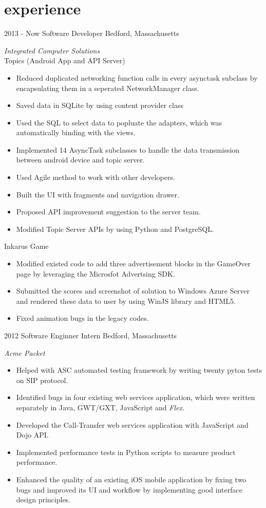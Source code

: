 \documentclass[]{ly-cv} %
\begin{document}
\section{experience}
\begin{entrylist}
\entry
{2013 - Now}
{Software Developer}
{Bedford, Massachusetts}
{\emph{Integrated Computer Solutions}\\
Topics (Android App and API Server)
\begin{itemize}
  \item Reduced duplicated networking function calls in every asynctask subclass by encapsulating them in a seperated NetworkManager class.
  \item Saved data in SQLite by using content provider class
  \item Used the SQL to select data to popluate the adapters, which was automatically binding with the views.
  \item Implemented 14 AsyncTask subclasses to handle the data transmission between android device and topic server.
  \item Used Agile method to work with other developers.
  \item Built the UI with fragments and navigation drawer.
  \item Proposed API improvement suggestion to the server team.
  \item Modified Topic Server APIs by using Python and PostgreSQL.
\end{itemize}

Inkarus Game
\begin{itemize}
  \item Modified existed code to add three advertisement blocks in the GameOver page by leveraging the Microsfot Advertsing SDK.
  \item Submitted the scores and screenshot of solution to Windows Azure Server and rendered these data to user by using WinJS library and HTML5.
  \item Fixed animation bugs in the legacy codes.
\end{itemize}}
\entry
{2012}
{Software Enginner Intern}
{Bedford, Massachusetts}
{\emph{Acme Packet}
\begin{itemize}
  \item Helped with ASC automated testing framework by writing twenty pyton tests on SIP protocol.
	\item Identified bugs in four existing web services application, which were written separately in Java, GWT/GXT, JavaScript and \emph{Flex}.
  \item Developed the Call-Transfer web services application with JavaScript and Dojo API.
	\item Implemented performance tests in Python scripts to measure product performance.
  \item Enhanced the quality of an existing iOS mobile application by fixing two bugs and improved its UI and workflow by implementing good interface design principles.
\end{itemize}}
\end{entrylist}
\end{document}
